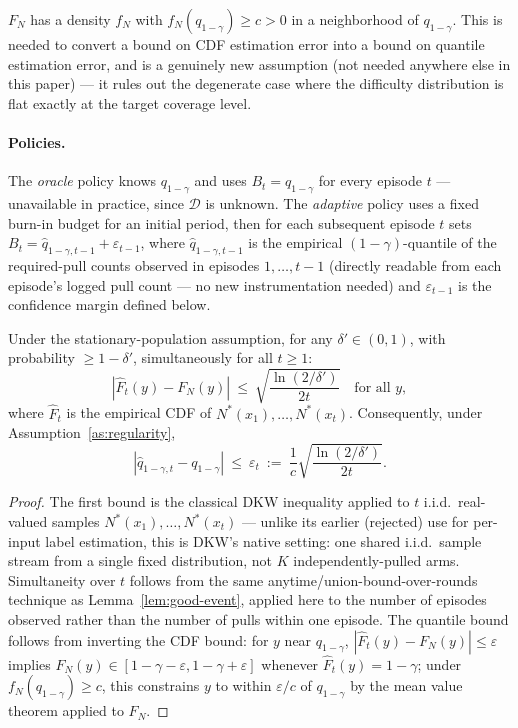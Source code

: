 \begin{assumption}
\label{as:regularity}
$F_N$ has a density $f_N$ with $f_N(q_{1-\gamma}) \geq c > 0$ in a neighborhood of $q_{1-\gamma}$. This is needed to convert a bound on CDF estimation error into a bound on quantile estimation error, and is a genuinely new assumption (not needed anywhere else in this paper) — it rules out the degenerate case where the difficulty distribution is flat exactly at the target coverage level.
\end{assumption}

\paragraph{Policies.} The \emph{oracle} policy knows $q_{1-\gamma}$ and uses $B_t = q_{1-\gamma}$ for every episode $t$ — unavailable in practice, since $\mathcal{D}$ is unknown. The \emph{adaptive} policy uses a fixed burn-in budget for an initial period, then for each subsequent episode $t$ sets $B_t = \hat q_{1-\gamma,t-1} + \varepsilon_{t-1}$, where $\hat q_{1-\gamma,t-1}$ is the empirical $(1-\gamma)$-quantile of the required-pull counts observed in episodes $1,\dots,t-1$ (directly readable from each episode's logged pull count — no new instrumentation needed) and $\varepsilon_{t-1}$ is the confidence margin defined below.

\begin{theorem}
\label{thm:quantile}
Under the stationary-population assumption, for any $\delta' \in (0,1)$, with probability $\geq 1-\delta'$, simultaneously for all $t \geq 1$:
$$
|\hat F_t(y) - F_N(y)| \ \leq\ \sqrt{\frac{\ln(2/\delta')}{2t}} \quad \text{for all } y,
$$
where $\hat F_t$ is the empirical CDF of $N^*(x_1), \dots, N^*(x_t)$. Consequently, under Assumption~\ref{as:regularity},
$$
|\hat q_{1-\gamma,t} - q_{1-\gamma}| \ \leq\ \varepsilon_t \ :=\ \frac{1}{c}\sqrt{\frac{\ln(2/\delta')}{2t}}.
$$
\end{theorem}

\begin{proof}
The first bound is the classical DKW inequality \citep{dkw1956, massart1990} applied to $t$ i.i.d.\ real-valued samples $N^*(x_1), \dots, N^*(x_t)$ — unlike its earlier (rejected) use for per-input label estimation, this is DKW's native setting: one shared i.i.d.\ sample stream from a single fixed distribution, not $K$ independently-pulled arms. Simultaneity over $t$ follows from the same anytime/union-bound-over-rounds technique as Lemma~\ref{lem:good-event}, applied here to the number of episodes observed rather than the number of pulls within one episode. The quantile bound follows from inverting the CDF bound: for $y$ near $q_{1-\gamma}$, $|\hat F_t(y) - F_N(y)| \leq \varepsilon$ implies $F_N(y) \in [1-\gamma-\varepsilon, 1-\gamma+\varepsilon]$ whenever $\hat F_t(y) = 1-\gamma$; under $f_N(q_{1-\gamma}) \geq c$, this constrains $y$ to within $\varepsilon/c$ of $q_{1-\gamma}$ by the mean value theorem applied to $F_N$.
\end{proof}

